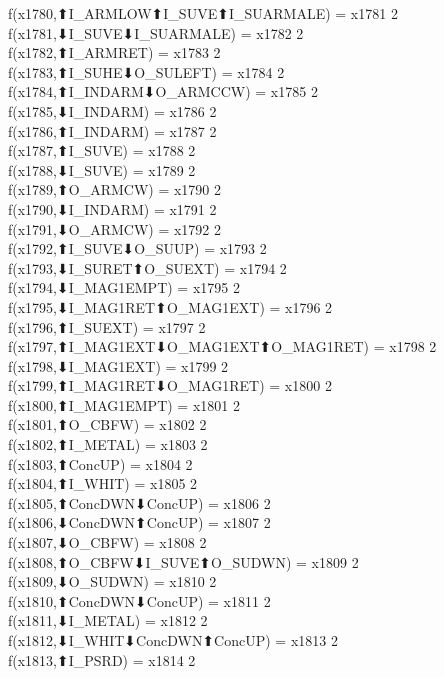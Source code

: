 f(x1780,⬆I_ARMLOW⬆I_SUVE⬆I_SUARMALE) = x1781 {2} \\
f(x1781,⬇I_SUVE⬇I_SUARMALE) = x1782 {2} \\
f(x1782,⬆I_ARMRET) = x1783 {2} \\
f(x1783,⬆I_SUHE⬇O_SULEFT) = x1784 {2} \\
f(x1784,⬆I_INDARM⬇O_ARMCCW) = x1785 {2} \\
f(x1785,⬇I_INDARM) = x1786 {2} \\
f(x1786,⬆I_INDARM) = x1787 {2} \\
f(x1787,⬆I_SUVE) = x1788 {2} \\
f(x1788,⬇I_SUVE) = x1789 {2} \\
f(x1789,⬆O_ARMCW) = x1790 {2} \\
f(x1790,⬇I_INDARM) = x1791 {2} \\
f(x1791,⬇O_ARMCW) = x1792 {2} \\
f(x1792,⬆I_SUVE⬇O_SUUP) = x1793 {2} \\
f(x1793,⬇I_SURET⬆O_SUEXT) = x1794 {2} \\
f(x1794,⬇I_MAG1EMPT) = x1795 {2} \\
f(x1795,⬇I_MAG1RET⬆O_MAG1EXT) = x1796 {2} \\
f(x1796,⬆I_SUEXT) = x1797 {2} \\
f(x1797,⬆I_MAG1EXT⬇O_MAG1EXT⬆O_MAG1RET) = x1798 {2} \\
f(x1798,⬇I_MAG1EXT) = x1799 {2} \\
f(x1799,⬆I_MAG1RET⬇O_MAG1RET) = x1800 {2} \\
f(x1800,⬆I_MAG1EMPT) = x1801 {2} \\
f(x1801,⬆O_CBFW) = x1802 {2} \\
f(x1802,⬆I_METAL) = x1803 {2} \\
f(x1803,⬆ConcUP) = x1804 {2} \\
f(x1804,⬆I_WHIT) = x1805 {2} \\
f(x1805,⬆ConcDWN⬇ConcUP) = x1806 {2} \\
f(x1806,⬇ConcDWN⬆ConcUP) = x1807 {2} \\
f(x1807,⬇O_CBFW) = x1808 {2} \\
f(x1808,⬆O_CBFW⬇I_SUVE⬆O_SUDWN) = x1809 {2} \\
f(x1809,⬇O_SUDWN) = x1810 {2} \\
f(x1810,⬆ConcDWN⬇ConcUP) = x1811 {2} \\
f(x1811,⬇I_METAL) = x1812 {2} \\
f(x1812,⬇I_WHIT⬇ConcDWN⬆ConcUP) = x1813 {2} \\
f(x1813,⬆I_PSRD) = x1814 {2} \\
